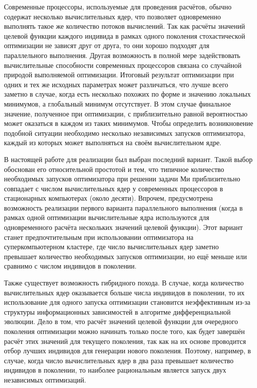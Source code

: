 Современные процессоры, используемые для проведения расчётов, обычно
 содержат несколько вычислительных ядер, что позволяет
одновременно выполнять такое же количество потоков вычислений. Так как расчёты
значений целевой функции каждого индивида в рамках одного
поколения стохастической оптимизации не зависят друг от друга, то они
хорошо подходят для параллельного выполнения. Другая возможность в
полной мере задействовать вычислительные способности современных
процессоров связана со случайной природой выполняемой
оптимизации. Итоговый результат оптимизации при одних и тех же
исходных параметрах может различаться, что лучше всего заметно в
случае, когда есть несколько похожих по форме и значению локальных
минимумов, а глобальный минимум отсутствует. В этом случае финальное
значение, полученное при оптимизации, с приблизительно равной
вероятностью может оказаться в каждом из таких минимумов. Чтобы
определить возникновение подобной ситуации необходимо несколько
независимых запусков оптимизатора, каждый из которых может выполняться
на своём вычислительном ядре.

В настоящей работе для реализации был выбран последний вариант. Такой
выбор обоснован его относительной простотой и тем, что типичное
количество необходимых запусков оптимизатора при решении
задачи Ми приблизительно совпадает с числом вычислительных ядер у
современных процессоров в стационарных компьютерах (около
десяти). Впрочем, предусмотрена возможность реализации первого
варианта параллельного выполнения (когда в рамках одной оптимизации
вычислительные ядра используются для одновременного расчёта
нескольких значений целевой функции). Этот вариант станет предпочтительным
при использовании оптимизатора на суперкомпьютерном кластере, где число
вычислительных ядер заметно превышает количество необходимых запусков
оптимизации, но ещё меньше или сравнимо с числом индивидов в поколении.

Также существует возможность гибридного похода. В случае, когда
количество вычислительных ядер оказывается больше числа индивидов в
поколении, то их использование для одного запуска оптимизации
становится неэффективным из-за структуры информационных зависимостей в
алгоритме дифференциальной эволюции. Дело в том, что расчёт значений
целевой функции для очередного поколения оптимизации можно начинать
только после того, как будет завершён расчёт этих значений для
текущего поколения, так как на их основе проводится отбор лучших индивидов
для генерации нового поколения. Поэтому,
например, в случае, когда число вычислительных ядер в два раза
превышает количество индивидов в поколении, то наиболее рациональным
является запуск двух независимых оптимизаций.

